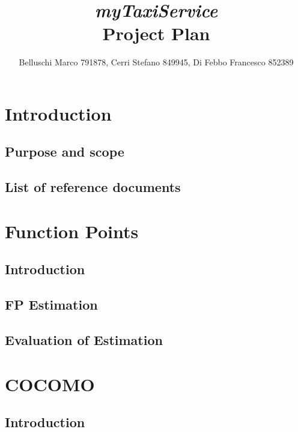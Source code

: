 \documentclass[]{report}
\begin{document}
\title{{\Huge\textit{myTaxiService}}\\{\Large Project Plan}}
\author{Belluschi Marco 791878, Cerri Stefano 849945, Di Febbo Francesco 852389}

\maketitle

\tableofcontents

\chapter{Introduction}

	\section{Purpose and scope}
	

	\section{List of reference documents}
	

\chapter{Function Points}

	\section{Introduction}
	
	
	\section{FP Estimation}
	
	
	\section{Evaluation of Estimation}
	

\chapter{COCOMO}

	\section{Introduction}
	
	
\end{document}
